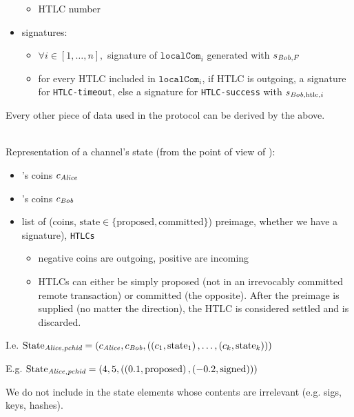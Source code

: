 \begin{itemize}
\begin{itemize}
        \item HTLC number
      \end{itemize}
    \item signatures:
    \begin{itemize}
      \item $\forall i \in [1, \dots, n],$ signature of $\mathtt{localCom}_i$
      generated with $s_{\mathit{Bob}, F}$
      \item for every HTLC included in $\mathtt{localCom}_i$, if HTLC is
      outgoing, a signature for \texttt{HTLC-timeout}, else a signature for
      \texttt{HTLC-success} with $s_{\mathit{Bob}, \mathrm{htlc}, i}$
    \end{itemize}
  \end{itemize}
  Every other piece of data used in the protocol can be derived by the above.

  \ \\

  Representation of a channel's state (from the point of view of \alice):
  \begin{itemize}
    \item \alice's coins $c_{\mathit{Alice}}$
    \item \bob's coins $c_{\mathit{Bob}}$
    \item list of (coins, $\mathrm{state} \in \{\mathrm{proposed},
    \mathrm{committed}\}$) preimage, whether we have a signature),
    \texttt{HTLCs}
    \begin{itemize}
      \item negative coins are outgoing, positive are incoming
      \item HTLCs can either be simply proposed (not in an irrevocably committed
      remote transaction) or committed (the opposite). After the preimage is
      supplied (no matter the direction), the HTLC is considered settled and is
      discarded.
    \end{itemize}
  \end{itemize}

  I.e. $\mathrm{State}_{\mathit{Alice}, \textit{pchid}} = \left(c_{\mathit{Alice}}, c_{\mathit{Bob}},
  \left(\left(c_1, \mathrm{state}_1\right), \dots, \left(c_k,
  \mathrm{state}_k\right)\right)\right)$

  E.g. $\mathrm{State}_{\mathit{Alice}, \textit{pchid}} = \left(4, 5, \left(\left(0.1,
  \mathrm{proposed}\right), \left(-0.2, \mathrm{signed}\right)\right)\right)$

  We do not include in the state elements whose contents are irrelevant (e.g.
  sigs, keys, hashes).
